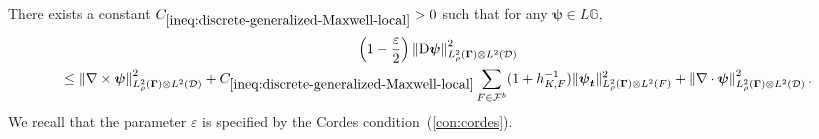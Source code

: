 \documentclass[final,onefignum,onetabnum]{mousaviart}
\begin{document}
	\vspace*{1mm}
	\begin{lemma}
		\label{lem:discrete-generalized-Maxwell}
		There exists a constant $C_{\ref{ineq:discrete-generalized-Maxwell-local}}>0$ such that for any $\boldsymbol{\psi} \in L \mathbb{G}$,
		\begin{multline}
			\label{ineq:discrete-generalized-Maxwell-local}
			\left( 1 - \frac{\varepsilon}{2} \right) 
			\left\| \mathrm{D} \boldsymbol{\psi} \right\|^2_{L^2_\rho(\boldsymbol{\Gamma}) \otimes L^2(\mathcal{D})}
			\\
			\leq
			\left\| \nabla \times \boldsymbol{\psi} \right\|^2_{L^2_\rho(\boldsymbol{\Gamma}) \otimes L^2(\mathcal{D})} 
			+
			C_{\ref{ineq:discrete-generalized-Maxwell-local}}
			\sum_{F \in \mathcal{F}^b} (1+ h_{K,F}^{-1})
			\lVert \boldsymbol{\psi}_{\boldsymbol{t}} \rVert^2_{ L^2_\rho(\boldsymbol{\Gamma}) \otimes L^2(F)}
			+
			\left\| \nabla \cdot \boldsymbol{\psi} \right\|^2_{ L^2_\rho(\boldsymbol{\Gamma}) \otimes L^2(\mathcal{\mathcal{D}})}.
		\end{multline}
		We recall that the parameter $\varepsilon$ is specified by the Cordes condition~(\ref{con:cordes}).
	\end{lemma}
	
\end{document}
